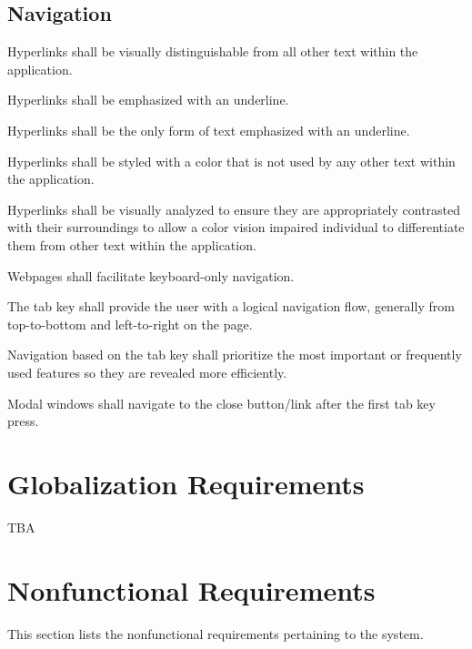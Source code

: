 \documentclass[12pt]{report}
\begin{document}
	\subsection{Navigation}
		\begin{reqlist}
			\item Hyperlinks shall be visually distinguishable from all other text within the application.
			\begin{reqlist}
				\item Hyperlinks shall be emphasized with an underline.
				\item Hyperlinks shall be the only form of text emphasized with an underline.
				\item Hyperlinks shall be styled with a color that is not used by any other text within the application.
				\item Hyperlinks shall be visually analyzed to ensure they are appropriately contrasted with their surroundings to allow a color vision impaired individual to differentiate them from other text within the application.
			\end{reqlist}
			\item Webpages shall facilitate keyboard-only navigation.
			\begin{reqlist}
				\item The tab key shall provide the user with a logical navigation flow, generally from top-to-bottom and left-to-right on the page.
				\item Navigation based on the tab key shall prioritize the most important or frequently used features so they are revealed more efficiently.
				\item Modal windows shall navigate to the close button/link after the first tab key press.
			\end{reqlist}
		\end{reqlist}
\section{Globalization Requirements}
	TBA
\section{Nonfunctional Requirements}
	This section lists the nonfunctional requirements pertaining to the system.
\end{document}
